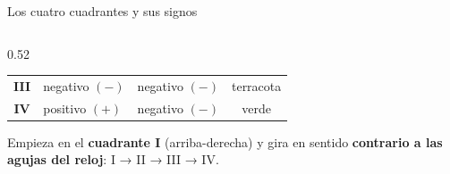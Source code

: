 \documentclass[aspectratio=169, 10pt, spanish]{beamer}
\begin{document}
\begin{frame}{Los cuatro cuadrantes y sus signos}
\begin{columns}[c]
\begin{column}{0.52\textwidth}
{\begin{tabular}{@{}cllc@{}}
        \textbf{III} & negativo $(-)$ & negativo $(-)$
          & \textcolor{AlmTerra}{terracota}\\
        \textbf{IV}  & positivo $(+)$ & negativo $(-)$
          & \textcolor{AlmVerde}{verde}\\
        \bottomrule
      \end{tabular}}
      \vspace{8pt}
      \begin{notabox}
        \AlmFontSmall
        Empieza en el \textbf{cuadrante I} (arriba-derecha)
        y gira en sentido \textbf{contrario a las agujas del reloj}:
        I → II → III → IV.
      \end{notabox}
    \end{column}
  \end{columns}
\end{frame}

\end{document}
